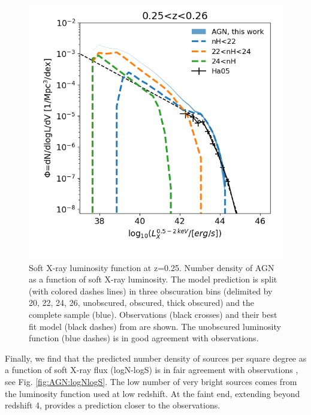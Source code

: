 \documentclass[twocolumn,iop]{openjournal}
\begin{document}
\begin{figure}
    \centering
    \includegraphics[width=0.95\linewidth]{figures_AGN/XLF_soft_z025.png}
    \caption{Soft X-ray luminosity function at z=0.25. 
    Number density of AGN as a function of soft X-ray luminosity. 
    The model prediction is split (with colored dashes lines) in three obscuration bins (delimited by 20, 22, 24, 26, unobscured, obscured, thick obscured) and the complete sample (blue).
    Observations (black crosses) and their best fit model (black dashes) from \citet[][Ha05]{HasingerMiyajiSchmidt2005A&A...441..417H} are shown. 
    The unobscured luminosity function (blue dashes) is in good agreement with observations.}
    \label{fig:AGN:softXLF}
\end{figure}

Finally, we find that the predicted number density of sources per square degree as a function of soft X-ray flux (logN-logS) is in fair agreement with observations \citep{MateosWarwickCarrera2008A&A...492...51M, GeorgakakisNandraLaird_2008MNRAS.388.1205G}, see Fig. \ref{fig:AGN:logNlogS}. 
The low number of very bright sources comes from the luminosity function used at low redshift. At the faint end, extending beyond redshift 4, provides a prediction closer to the observations.
\end{document}
